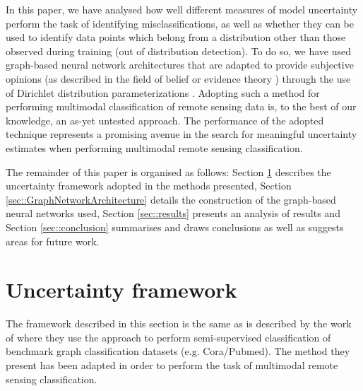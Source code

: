 \documentclass[
twocolumn,
]{ceurart}
\begin{document}
In this paper, we have analysed how well different measures of model uncertainty perform the task of identifying misclassifications, as well as whether they can be used to identify data points which belong from a distribution other than those observed during training (out of distribution detection).
To do so, we have used graph-based neural network architectures that are adapted to provide subjective opinions (as described in the field of belief or evidence theory \cite{Josang2018}) through the use of Dirichlet distribution parameterizations \cite{Kipf2017, ZhaoXujiang2020}.
Adopting such a method for performing multimodal classification of remote sensing data is, to the best of our knowledge, an as-yet untested approach. The performance of the adopted technique represents a promising avenue in the search for meaningful uncertainty estimates when performing multimodal remote sensing classification.

The remainder of this paper is organised as follows: Section \ref{sec::unc_framework} describes the uncertainty framework adopted in the methods presented, Section \ref{sec::GraphNetworkArchitecture} details the construction of the graph-based neural networks used, Section \ref{sec::results} presents an analysis of results and Section \ref{sec::conclusion} summarises and draws conclusions as well as suggests areas for future work.

\section{Uncertainty framework}
\label{sec::unc_framework}

The framework described in this section is the same as is described by the work of \cite{ZhaoXujiang2020} where they use the approach to perform semi-supervised classification of benchmark graph classification datasets (e.g. Cora/Pubmed). The method they present has been adapted in order to perform the task of multimodal remote sensing classification.
\end{document}
